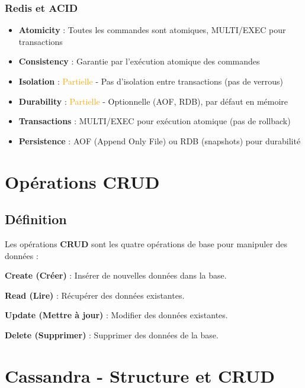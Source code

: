\documentclass[11pt,a4paper]{article}
\begin{document}
\subsubsection{Redis et ACID}

\begin{itemize}
    \item \textbf{Atomicity} : \checkmark Toutes les commandes sont atomiques, MULTI/EXEC pour transactions
    \item \textbf{Consistency} : \checkmark Garantie par l'exécution atomique des commandes
    \item \textbf{Isolation} : \textcolor{orange}{Partielle} - Pas d'isolation entre transactions (pas de verrous)
    \item \textbf{Durability} : \textcolor{orange}{Partielle} - Optionnelle (AOF, RDB), par défaut en mémoire
    \item \textbf{Transactions} : MULTI/EXEC pour exécution atomique (pas de rollback)
    \item \textbf{Persistence} : AOF (Append Only File) ou RDB (snapshots) pour durabilité
\end{itemize}

\newpage

\section{Opérations CRUD}

\subsection{Définition}

Les opérations \textbf{CRUD} sont les quatre opérations de base pour manipuler des données :

\begin{definitionbox}
\textbf{Create (Créer)} : Insérer de nouvelles données dans la base.

\textbf{Read (Lire)} : Récupérer des données existantes.

\textbf{Update (Mettre à jour)} : Modifier des données existantes.

\textbf{Delete (Supprimer)} : Supprimer des données de la base.
\end{definitionbox}

\newpage

\section{Cassandra - Structure et CRUD}
\end{document}

